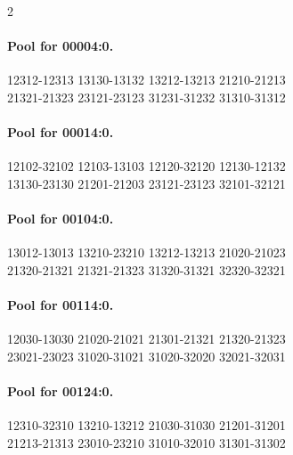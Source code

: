 \documentclass[11pt]{article}
\numberwithin{equation}{section}
\numberwithin{table}{section}
\begin{document}
\begin{multicols}{2}
\paragraph{Pool for 00004:0.}
\begingroup\footnotesize\ttfamily\begin{flushleft}
12312-12313 13130-13132 13212-13213 21210-21213\\
21321-21323 23121-23123 31231-31232 31310-31312\\
\end{flushleft}\endgroup
\paragraph{Pool for 00014:0.}
\begingroup\footnotesize\ttfamily\begin{flushleft}
12102-32102 12103-13103 12120-32120 12130-12132\\
13130-23130 21201-21203 23121-23123 32101-32121\\
\end{flushleft}\endgroup
\paragraph{Pool for 00104:0.}
\begingroup\footnotesize\ttfamily\begin{flushleft}
13012-13013 13210-23210 13212-13213 21020-21023\\
21320-21321 21321-21323 31320-31321 32320-32321\\
\end{flushleft}\endgroup
\paragraph{Pool for 00114:0.}
\begingroup\footnotesize\ttfamily\begin{flushleft}
12030-13030 21020-21021 21301-21321 21320-21323\\
23021-23023 31020-31021 31020-32020 32021-32031\\
\end{flushleft}\endgroup
\paragraph{Pool for 00124:0.}
\begingroup\footnotesize\ttfamily\begin{flushleft}
12310-32310 13210-13212 21030-31030 21201-31201\\
21213-21313 23010-23210 31010-32010 31301-31302\\
\end{flushleft}\endgroup

\end{multicols}
\end{document}

